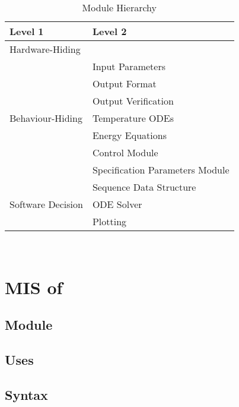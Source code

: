 \documentclass[12pt, titlepage]{article}
\begin{document}
\begin{table}[h!]
\centering
\begin{tabular}{p{} p{}}
\toprule
\textbf{Level 1} & \textbf{Level 2}\\
\midrule

{Hardware-Hiding} & ~ \\
\midrule

\multirow{7}{0.3\textwidth}{Behaviour-Hiding} & Input Parameters\\
& Output Format\\
& Output Verification\\
& Temperature ODEs\\
& Energy Equations\\ 
& Control Module\\
& Specification Parameters Module\\
\midrule

\multirow{3}{0.3\textwidth}{Software Decision} & {Sequence Data Structure}\\
& ODE Solver\\
& Plotting\\
\bottomrule

\end{tabular}
\caption{Module Hierarchy}
\label{TblMH}
\end{table}

\newpage
~\newpage

\section{MIS of } \label{Module} 



\subsection{Module}


\subsection{Uses}


\subsection{Syntax}
\end{document}
